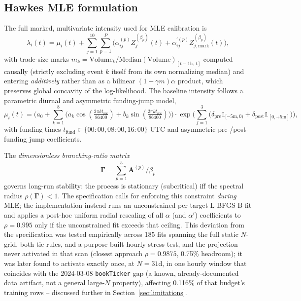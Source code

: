\subsection{Hawkes MLE formulation}
\label{sec:methodology-hawkes}

The full marked, multivariate intensity used for MLE calibration is
\[
  \lambda_i(t) = \mu_i(t) + \sum_{j=1}^{10} \sum_{p=1}^{P}
    \Big( \alpha_{ij}^{(p)} Z_j^{(\beta_p)}(t) + \alpha_{ij}^{\prime(p)} Z_{j,\mathrm{mark}}^{(\beta_p)}(t) \Big),
\]
with trade-size marks $m_k = \mathrm{Volume}_k / \mathrm{Median}(\mathrm{Volume})_{[t-1\mathrm{h},\,t]}$
computed causally (strictly excluding event $k$ itself from its own
normalizing median) and entering \emph{additively} rather than as a
bilinear $(1+\gamma m)\alpha$ product, which preserves global concavity
of the log-likelihood. The baseline intensity follows a parametric
diurnal and asymmetric funding-jump model,
\[
  \mu_i(t) = \Big(a_0 + \sum_{k=1}^{8}\big(a_k\cos(\tfrac{2\pi k t_{\mathrm{sec}}}{86400}) + b_k\sin(\tfrac{2\pi k t_{\mathrm{sec}}}{86400})\big)\Big)
  \cdot \exp\Big(\sum_{f=1}^{3}\big(\delta_{\mathrm{pre}}\mathbb{1}_{[-5\mathrm{m},0)} + \delta_{\mathrm{post}}\mathbb{1}_{[0,+5\mathrm{m}]}\big)\Big),
\]
with funding times $t_{\mathrm{fund}} \in \{00{:}00, 08{:}00, 16{:}00\}$
UTC and asymmetric pre-/post-funding jump coefficients.

The \emph{dimensionless branching-ratio matrix}
\[
  \boldsymbol{\Gamma} = \sum_{p=1}^{5} \mathbf{A}^{(p)} / \beta_p
\]
governs long-run stability: the process is stationary (subcritical) iff
the spectral radius $\rho(\boldsymbol{\Gamma}) < 1$. The specification
calls for enforcing this constraint \emph{during} MLE; the implementation
instead runs an unconstrained per-target L-BFGS-B fit and applies a
post-hoc uniform radial rescaling of all $\alpha$ (and $\alpha'$)
coefficients to $\rho = 0.995$ only if the unconstrained fit exceeds that
ceiling. This deviation from the specification was tested empirically
across 185 fits spanning the full static $N$-grid, both tie rules, and a
purpose-built hourly stress test, and the projection never activated in
that scan (closest approach $\rho = 0.9875$, 0.75\% headroom); it was
later found to activate exactly once, at $N=31$d, in one hourly window
that coincides with the 2024-03-08 \texttt{bookTicker} gap (a known,
already-documented data artifact, not a general large-$N$ property),
affecting 0.116\% of that budget's training rows -- discussed further in
Section~\ref{sec:limitations}.

